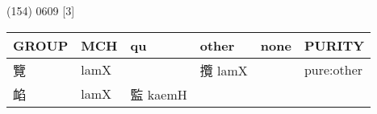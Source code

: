 \documentclass[14pt,a4paper]{scrartcl}
\begin{document}
(154) 0609 {[}3{]}

\begin{longtable}[c]{@{}llllll@{}}
\toprule
\begin{minipage}[b]{0.14\columnwidth}\raggedright\strut
GROUP
\strut\end{minipage} &
\begin{minipage}[b]{0.14\columnwidth}\raggedright\strut
MCH
\strut\end{minipage} &
\begin{minipage}[b]{0.14\columnwidth}\raggedright\strut
qu
\strut\end{minipage} &
\begin{minipage}[b]{0.14\columnwidth}\raggedright\strut
other
\strut\end{minipage} &
\begin{minipage}[b]{0.14\columnwidth}\raggedright\strut
none
\strut\end{minipage} &
\begin{minipage}[b]{0.14\columnwidth}\raggedright\strut
PURITY
\strut\end{minipage}\tabularnewline
\midrule
\endhead
\begin{minipage}[t]{0.14\columnwidth}\raggedright\strut
覽
\strut\end{minipage} &
\begin{minipage}[t]{0.14\columnwidth}\raggedright\strut
lamX
\strut\end{minipage} &
\begin{minipage}[t]{0.14\columnwidth}\raggedright\strut
\strut\end{minipage} &
\begin{minipage}[t]{0.14\columnwidth}\raggedright\strut
攬 lamX
\strut\end{minipage} &
\begin{minipage}[t]{0.14\columnwidth}\raggedright\strut
\strut\end{minipage} &
\begin{minipage}[t]{0.14\columnwidth}\raggedright\strut
pure:other
\strut\end{minipage}\tabularnewline
\begin{minipage}[t]{0.14\columnwidth}\raggedright\strut
䘓
\strut\end{minipage} &
\begin{minipage}[t]{0.14\columnwidth}\raggedright\strut
lamX
\strut\end{minipage} &
\begin{minipage}[t]{0.14\columnwidth}\raggedright\strut
監 kaemH
\strut\end{minipage} &

\end{longtable}
\end{document}
